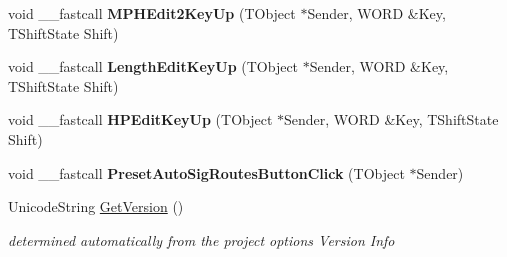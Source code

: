 \begin{DoxyCompactItemize}
void \+\_\+\+\_\+fastcall {\bfseries M\+P\+H\+Edit2\+Key\+Up} (T\+Object $\ast$Sender, W\+O\+RD \&Key, T\+Shift\+State Shift)
\item 
\mbox{\label{class_t_interface_a53206fd4d6f35c1f1981f018cf3a53df}} 
void \+\_\+\+\_\+fastcall {\bfseries Length\+Edit\+Key\+Up} (T\+Object $\ast$Sender, W\+O\+RD \&Key, T\+Shift\+State Shift)
\item 
\mbox{\label{class_t_interface_a748c0543de03f148759e8bcec6b1dd91}} 
void \+\_\+\+\_\+fastcall {\bfseries H\+P\+Edit\+Key\+Up} (T\+Object $\ast$Sender, W\+O\+RD \&Key, T\+Shift\+State Shift)
\item 
\mbox{\label{class_t_interface_aa639148521a793641e694b15486b5055}} 
void \+\_\+\+\_\+fastcall {\bfseries Preset\+Auto\+Sig\+Routes\+Button\+Click} (T\+Object $\ast$Sender)
\item 
\mbox{\label{class_t_interface_aa09ce755ae1d39671b9b358f86d83fde}} 
Unicode\+String \mbox{\hyperlink{class_t_interface_aa09ce755ae1d39671b9b358f86d83fde}{Get\+Version}} ()
\begin{DoxyCompactList}\small\item\em determined automatically from the project options \textquotesingle{}Version Info\textquotesingle{} \end{DoxyCompactList}\end{DoxyCompactItemize}
